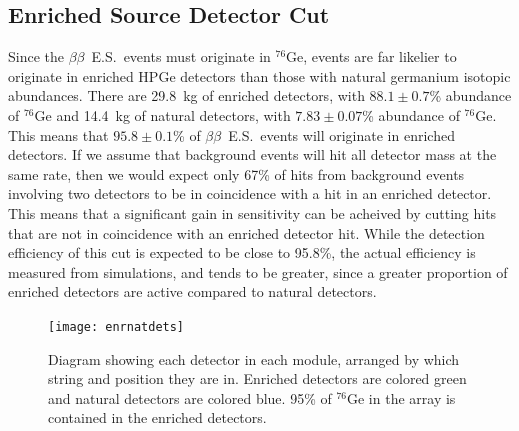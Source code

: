 \documentclass[notitlepage,rmp,aps,10pt]{revtex4-1}
\newcommand{\bb}{${\beta \beta}$}
\newcommand{\bbes}{\bb~E.S.}
\newcommand{\iso}[2]{$^{#1}$#2}
\newcommand{\Ge}[1]{\iso{#1}{Ge}}
\begin{document}
\subsection{Enriched Source Detector Cut}
Since the \bbes\ events must originate in \Ge{76}, events are far likelier to originate in enriched HPGe detectors than those with natural germanium isotopic abundances.
There are 29.8~kg of enriched detectors, with $88.1 \pm 0.7$\% abundance of \Ge{76} and 14.4~kg of natural detectors, with $7.83 \pm 0.07$\% abundance of \Ge{76}.
This means that $95.8 \pm 0.1$\% of \bbes\ events will originate in enriched detectors.
If we assume that background events will hit all detector mass at the same rate, then we would expect only 67\% of hits from background events involving two detectors to be in coincidence with a hit in an enriched detector.
This means that a significant gain in sensitivity can be acheived by cutting hits that are not in coincidence with an enriched detector hit.
While the detection efficiency of this cut is expected to be close to 95.8\%, the actual efficiency is measured from simulations, and tends to be greater, since a greater proportion of enriched detectors are active compared to natural detectors.

\begin{figure}[h]
  \centering
  \texttt{[image: enrnatdets]}
  \caption[Module 1 and Module 2 enriched and natural detectors]{\label{fig:Ge76BBLevelDiagram}
    Diagram showing each detector in each module, arranged by which string and position they are in. Enriched detectors are colored green and natural detectors are colored blue. 95\% of \Ge{76} in the array is contained in the enriched detectors.}
\end{figure}
\end{document}
